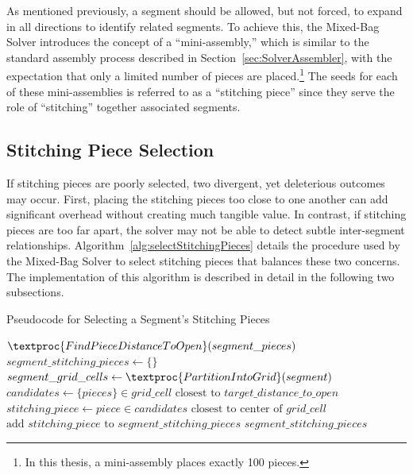 As mentioned previously, a segment should be allowed, but not forced, to expand in all directions to identify related segments.  To achieve this, the Mixed-Bag Solver introduces the concept of a ``mini-assembly,'' which is similar to the standard assembly process described in Section~\ref{sec:SolverAssembler}, with the expectation that only a limited number of pieces are placed.\footnote{In this thesis, a mini-assembly places exactly 100 pieces.}  The seeds for each of these mini-assemblies is referred to as a ``stitching piece'' since they serve the role of ``stitching'' together associated segments.

\subsection{Stitching Piece Selection}\label{sec:stitchingPieceSelection}

If stitching pieces are poorly selected, two divergent, yet deleterious outcomes may occur.  First, placing the stitching pieces too close to one another can add significant overhead without creating much tangible value.  In contrast, if stitching pieces are too far apart, the solver may not be able to detect subtle inter-segment relationships.  Algorithm~\ref{alg:selectStitchingPieces} details the procedure used by the Mixed-Bag Solver to select stitching pieces that balances these two concerns.  The implementation of this algorithm is described in detail in the following two subsections.

\begin{algorithm}[t]
\caption{Pseudocode for Selecting a Segment's Stitching Pieces}
\label{alg:selectStitchingPieces}
\begin{algorithmic}[1]
	\State $\textproc{FindPieceDistanceToOpen}(segment\_pieces)$
	\State $segment\_stitching\_pieces \gets \{ \}$
    \State $segment\_grid\_cells \gets \textproc{PartitionIntoGrid}(segment)$
			\State $candidates \gets \{ pieces \} \in grid\_cell \text{ closest to } target\_distance\_to\_open$
			\State $stitching\_piece \gets piece \in candidates \text{ closest to center of } grid\_cell$
			\State $\text{add } stitching\_piece \text{ to } segment\_stitching\_pieces$
		\EndIf
	\EndFor
	\State \Return $segment\_stitching\_pieces$
\EndProcedure
\end{algorithmic}
\end{algorithm}


